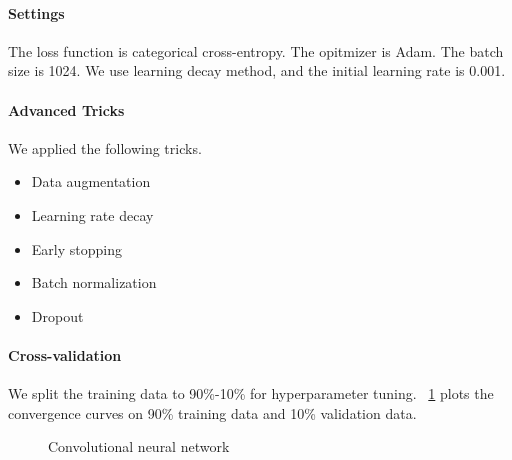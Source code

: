 \documentclass[]{article}
\begin{document}
\paragraph{Settings}
The loss function is categorical cross-entropy. The opitmizer is Adam. The batch size is 1024. We use learning decay method, and the initial learning rate is 0.001.

\paragraph{Advanced Tricks}
We applied the following tricks.
\begin{multicols}{3}
\begin{itemize}
    \item Data augmentation
    \item Learning rate decay
    \item Early stopping
    \item Batch normalization
    \item Dropout
\end{itemize}
\end{multicols}

\paragraph{Cross-validation}
We split the training data to 90\%-10\% for hyperparameter tuning. \figurename{~\ref{fig:cnn_result}} plots the convergence curves on 90\% training data and 10\% validation data.
\begin{figure}[H]
    \centering
    \caption{Convolutional neural network}
    \label{fig:cnn_result}
\end{figure}
\end{document}
